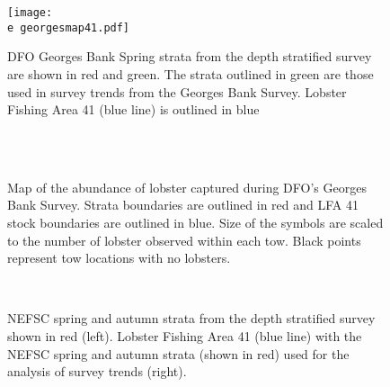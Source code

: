 \documentclass[11pt]{article}
\newcommand{\D}{.}
\newcommand{\e}{/backup/bio_data/bio.lobster/figures/} %
\begin{document}
\begin{figure}

    \texttt{[image: \\e georgesmap41.pdf]}
    \caption{DFO Georges Bank Spring strata from the depth stratified survey are shown in red and green. The strata outlined in green are those used in survey trends from the Georges Bank Survey. Lobster Fishing Area 41 (blue line) is outlined in blue}

\end{figure}


\begin{landscape}


        \begin{figure}
        \centering
        \\
        \\

         \caption{Map of the abundance of lobster captured during DFO's Georges Bank Survey. Strata boundaries are outlined in red and LFA 41 stock boundaries are outlined in blue. Size of the symbols are scaled to the number of lobster observed within each tow. Black points represent tow locations with no lobsters.}
        \end{figure}
        \clearpage






\begin{figure}
\centering
{}
\\
\caption{NEFSC spring and autumn strata from the depth stratified survey shown in red (left). Lobster Fishing Area 41 (blue line) with the NEFSC spring and autumn strata (shown in red) used for the analysis of survey trends (right).}
\end{figure}


\end{landscape}
\end{document}
